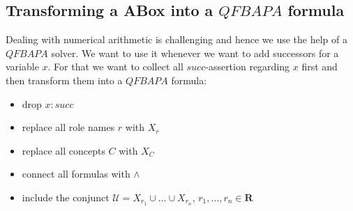 \documentclass[a4paper,11pt]{scrartcl}
\theoremstyle{break}
\theoremstyle{definition}
\begin{document}
\subsection{Transforming a ABox into a $QFBAPA$ formula}
Dealing with numerical arithmetic is challenging and hence we use the help of a $QFBAPA$ solver. We want to use it whenever we want to add successors for a variable $x$. For that we want to collect all $succ$-assertion regarding $x$ first and then transform them into a $QFBAPA$ formula:
\begin{itemize}
\item drop $x:succ$
\item replace all role names $r$ with $X_r$
\item replace all concepts $C$ with $X_C$
\item connect all formulas with $\wedge$
\item include the conjunct $\mathcal{U}=X_{r_1}\cup\dots\cup X_{r_n}$, $r_1,\dots, r_n\in\mathbf{R}$
\end{itemize}
\end{document}
